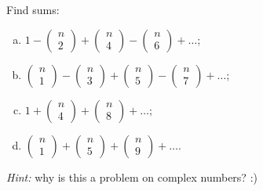 \begin{problem}
Find sums:
\begin{enumerate}[a) ]
\item $1-\left(\begin{array}{l}n \\ 2\end{array}\right)+\left(\begin{array}{l}n \\ 4\end{array}\right)-\left(\begin{array}{l}n \\ 6\end{array}\right)+\ldots$;
\item $\left(\begin{array}{l}n \\ 1\end{array}\right)-\left(\begin{array}{l}n \\ 3\end{array}\right)+\left(\begin{array}{l}n \\ 5\end{array}\right)-\left(\begin{array}{l}n \\ 7\end{array}\right)+\ldots$;
\item $1+\left(\begin{array}{l}n \\ 4\end{array}\right)+\left(\begin{array}{l}n \\ 8\end{array}\right)+\ldots ;$ 
\item $\left(\begin{array}{l}n \\ 1\end{array}\right)+\left(\begin{array}{l}n \\ 5\end{array}\right)+\left(\begin{array}{l}n \\ 9\end{array}\right)+\ldots$.
\end{enumerate}
\end{problem}

{\it Hint:} why is this a problem on complex numbers? :)

